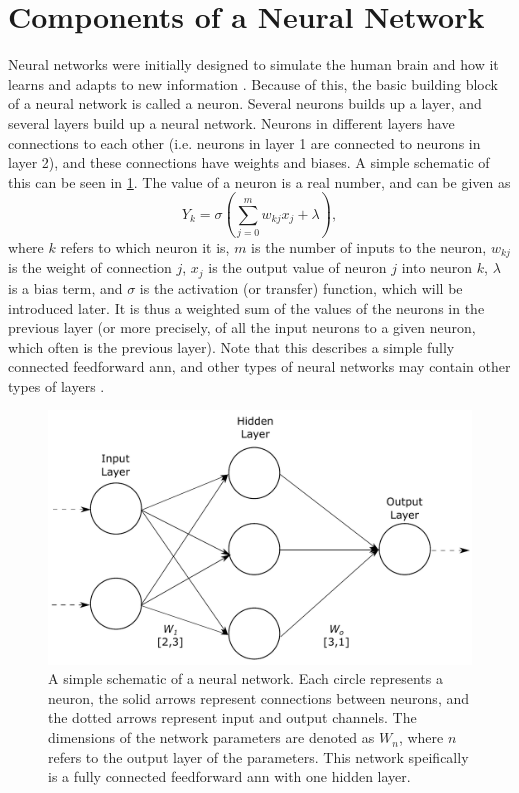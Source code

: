 \section{Components of a Neural Network}
\label{sec:ml:componentsofaneuralnetwork}
Neural networks were initially designed to simulate the human brain and how it learns and adapts to new information \cite{McCulloch1943}. Because of this, the basic building block of a neural network is called a neuron. Several neurons builds up a layer, and several layers build up a neural network. Neurons in different layers have connections to each other (i.e. neurons in layer 1 are connected to neurons in layer 2), and these connections have weights and biases. A simple schematic of this can be seen in \cref{fig:neuralnetwork}. The value of a neuron is a real number, and can be given as \cite[81]{Wang2003}
\begin{equation}
    \label{eq:neuron}
    Y_{k} = \sigma\left(\sum_{j=0}^{m}w_{kj}x_j + \lambda \right),
\end{equation}
where $k$ refers to which neuron it is, $m$ is the number of inputs to the neuron, $w_{kj}$ is the weight of connection $j$, $x_j$ is the output value of neuron $j$ into neuron $k$, $\lambda$ is a bias term, and $\sigma$ is the activation (or transfer) function, which will be introduced later. It is thus a weighted sum of the values of the neurons in the previous layer (or more precisely, of all the input neurons to a given neuron, which often is the previous layer). Note that this describes a simple fully connected feedforward \acrfull{ann}, and other types of neural networks may contain other types of layers \cite{oshea2015introduction}.

\begin{figure}[htbp]  
    \centering
    \includegraphics[width=.8\textwidth]{figures/neuralnetwork.pdf}
    \caption[Neural network example]{A simple schematic of a neural network. Each circle represents a neuron, the solid arrows represent connections between neurons, and the dotted arrows represent input and output channels. The dimensions of the network parameters are denoted as $W_n$, where $n$ refers to the output layer of the parameters. This network speifically is a fully connected feedforward \acrlong{ann} with one hidden layer. }
    \label{fig:neuralnetwork}
\end{figure}

